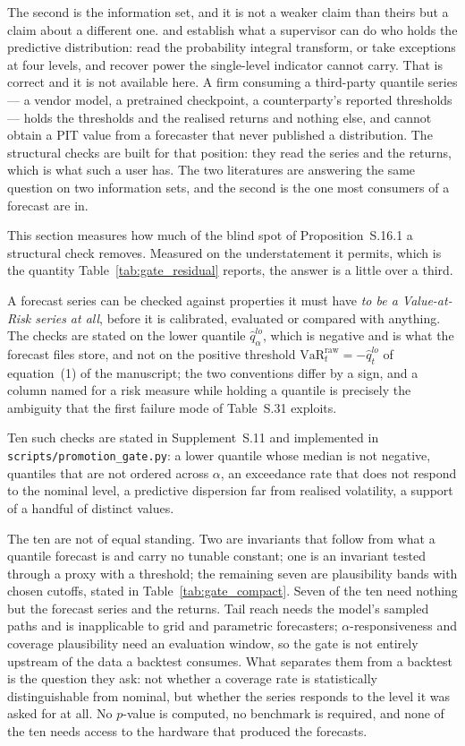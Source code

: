 \documentclass[preprint,11pt,authoryear]{elsarticle}
\newcommand{\VaR}{\mathrm{VaR}}
\newcommand{\1}{\boldsymbol{1}}
\begin{document}
The second is the information set, and it is not a weaker claim than theirs but a
claim about a different one. \citet{gordy2020spectral} and
\citet{kratz2018multinomial} establish what a supervisor can do who holds the
predictive distribution: read the probability integral transform, or take
exceptions at four levels, and recover power the single-level indicator cannot
carry. That is correct and it is not available here. A firm consuming a
third-party quantile series --- a vendor model, a pretrained checkpoint, a
counterparty's reported thresholds --- holds the thresholds and the realised
returns and nothing else, and cannot obtain a PIT value from a forecaster that
never published a distribution. The structural checks are built for that
position: they read the series and the returns, which is what such a user has.
The two literatures are answering the same question on two information sets, and
the second is the one most consumers of a forecast are in.

This section measures how much of the blind spot of
Proposition~S.16.1 a structural check removes. Measured on
the understatement it permits, which is the quantity
Table~\ref{tab:gate_residual} reports, the answer is a little over a third.

A forecast series can be checked against properties it must have \emph{to be a
Value-at-Risk series at all}, before it is calibrated, evaluated or compared with
anything. The checks are stated on the lower quantile $\hat q^{lo}_\alpha$, which
is negative and is what the forecast files store, and not on the positive
threshold $\VaR_t^{\mathrm{raw}} = -\hat q_t^{lo}$ of
equation~(1) of the manuscript; the two conventions differ by a sign, and a column
named for a risk measure while holding a quantile is precisely the ambiguity
that the first failure mode of Table~S.31 exploits.

Ten such checks are stated in Supplement~S.11 and implemented in
\texttt{scripts/promotion\_gate.py}: a lower quantile whose median is not
negative, quantiles that are not ordered across $\alpha$, an exceedance rate that
does not respond to the nominal level, a predictive dispersion far from realised
volatility, a support of a handful of distinct values.

The ten are not of equal standing. Two are invariants that follow from what a
quantile forecast is and carry no tunable constant; one is an invariant tested
through a proxy with a threshold; the remaining seven are plausibility bands
with chosen cutoffs, stated in Table~\ref{tab:gate_compact}. Seven of the ten need nothing but the forecast
series and the returns. Tail reach needs the model's sampled paths and is
inapplicable to grid and parametric forecasters; $\alpha$-responsiveness and
coverage plausibility need an evaluation window, so the gate is not entirely
upstream of the data a backtest consumes. What separates them from a backtest is the
question they ask: not whether a coverage rate is statistically distinguishable
from nominal, but whether the series responds to the level it was asked for at
all. No $p$-value is computed, no benchmark is required, and none of the ten
needs access to the hardware that produced the forecasts.
\end{document}
